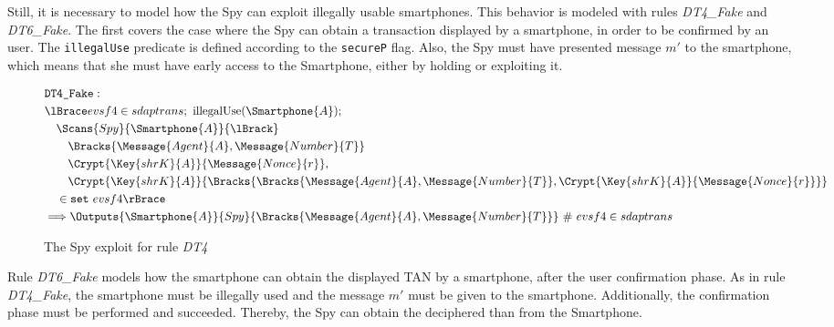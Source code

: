 Still, it is necessary to model how the Spy can exploit illegally usable smartphones. This behavior is modeled with rules \textit{DT4\_Fake} and \textit{DT6\_Fake}. The first covers the case where the Spy can obtain a transaction displayed by a smartphone, in order to be confirmed by an user. The \texttt{illegalUse} predicate is defined according to the \texttt{secureP} flag. Also, the Spy must have presented message \(m'\) to the smartphone, which means that she must have early access to the Smartphone, either by holding or exploiting it.

\begin{figure}[!h]
  \begin{align*}
    & \texttt{DT4\_Fake}: \\
    & \lBrace evsf4 \in sdaptrans;\ \text{illegalUse}(\Smartphone{A}); \\
    & \quad \Scans{Spy}{\Smartphone{A}}{\lBrack} \\
    & \qquad \Bracks{\Message{Agent}{A}, \Message{Number}{T}} \\
    & \qquad \Crypt{\Key{shrK}{A}}{\Message{Nonce}{r}}, \\
    & \qquad \Crypt{\Key{shrK}{A}}{\Bracks{\Bracks{\Message{Agent}{A}, \Message{Number}{T}}, \Crypt{\Key{shrK}{A}}{\Message{Nonce}{r}}}} \\
    & \quad \in \texttt{set} \ evsf4 \rBrace \\
    & \Longrightarrow \Outputs{\Smartphone{A}}{Spy}{\Bracks{\Message{Agent}{A}, \Message{Number}{T}}} \ \# \ evsf4 \in sdaptrans
  \end{align*}
  \label{fig:dap-model-threat-dt4}
  \caption{The Spy exploit for rule \textit{DT4}}
\end{figure}

Rule \textit{DT6\_Fake} models how the smartphone can obtain the displayed TAN by a smartphone, after the user confirmation phase. As in rule \textit{DT4\_Fake}, the smartphone must be illegally used and the message $m'$ must be given to the smartphone. Additionally, the confirmation phase must be performed and succeeded. Thereby, the Spy can obtain the deciphered than from the Smartphone.

